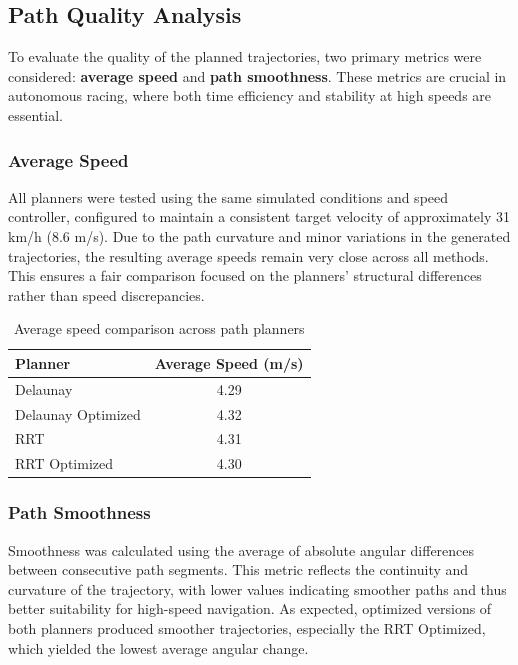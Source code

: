 \documentclass[a4paper,11pt]{report}
\begin{document}
\subsection{Path Quality Analysis}

To evaluate the quality of the planned trajectories, two primary metrics were considered: \textbf{average speed} and \textbf{path smoothness}. These metrics are crucial in autonomous racing, where both time efficiency and stability at high speeds are essential.

\subsubsection*{Average Speed}

All planners were tested using the same simulated conditions and speed controller, configured to maintain a consistent target velocity of approximately 31 km/h (8.6 m/s). Due to the path curvature and minor variations in the generated trajectories, the resulting average speeds remain very close across all methods. This ensures a fair comparison focused on the planners' structural differences rather than speed discrepancies.

\begin{table}[H]
\centering
\begin{tabular}{|l|c|}
\hline
\textbf{Planner} & \textbf{Average Speed (m/s)} \\
\hline
Delaunay & 4.29 \\
Delaunay Optimized & 4.32 \\
RRT & 4.31 \\
RRT Optimized & 4.30 \\
\hline
\end{tabular}
\caption{Average speed comparison across path planners}
\end{table}

\subsubsection*{Path Smoothness}

Smoothness was calculated using the average of absolute angular differences between consecutive path segments. This metric reflects the continuity and curvature of the trajectory, with lower values indicating smoother paths and thus better suitability for high-speed navigation. As expected, optimized versions of both planners produced smoother trajectories, especially the RRT Optimized, which yielded the lowest average angular change.
\end{document}
